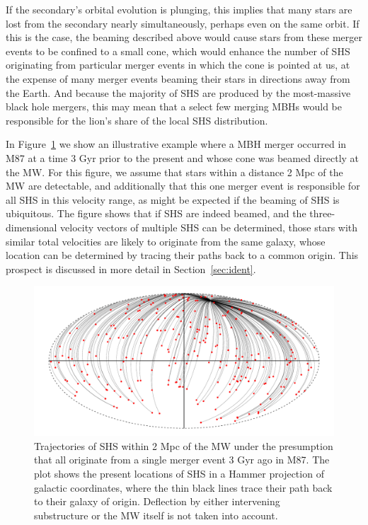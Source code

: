 \documentclass[a4paper,twocolumn]{emulateapj}
\begin{document}
{If the secondary's orbital evolution is plunging, this implies that many stars are lost from the secondary nearly simultaneously, perhaps even on the same orbit. If this is the case, the beaming described above would cause stars from these merger events to be confined to a small cone, which would enhance the number of SHS originating from particular merger events in which the cone is pointed at us, at the expense of many merger events beaming their stars in directions away from the Earth. And because the majority of SHS are produced by the most-massive black hole mergers, this may mean that a select few merging MBHs would be responsible for the lion's share of the local SHS distribution.

In Figure~\ref{fig:m87} we show an illustrative example where a MBH merger occurred in M87 at a time 3 Gyr prior to the present and whose cone was beamed directly at the MW. For this figure, we assume that stars within a distance 2 Mpc of the MW are detectable, and additionally that this one merger event is responsible for all SHS in this velocity range, as might be expected if the beaming of SHS is ubiquitous. The figure shows that if SHS are indeed beamed, and the three-dimensional velocity vectors of multiple SHS can be determined, those stars with similar total velocities are likely to originate from the same galaxy, whose location can be determined by tracing their paths back to a common origin. This prospect is discussed in more detail in Section~\ref{sec:ident}.

\begin{figure}
\centering\includegraphics[width=\linewidth,clip=true]{m87}
\caption{Trajectories of SHS within 2 Mpc of the MW under the presumption that all originate from a single merger event 3 Gyr ago in M87. The plot shows the present locations of SHS in a Hammer projection of galactic coordinates, where the thin black lines trace their path back to their galaxy of origin. Deflection by either intervening substructure or the MW itself is not taken into account.}
\label{fig:m87}
\end{figure}

}
\end{document}
